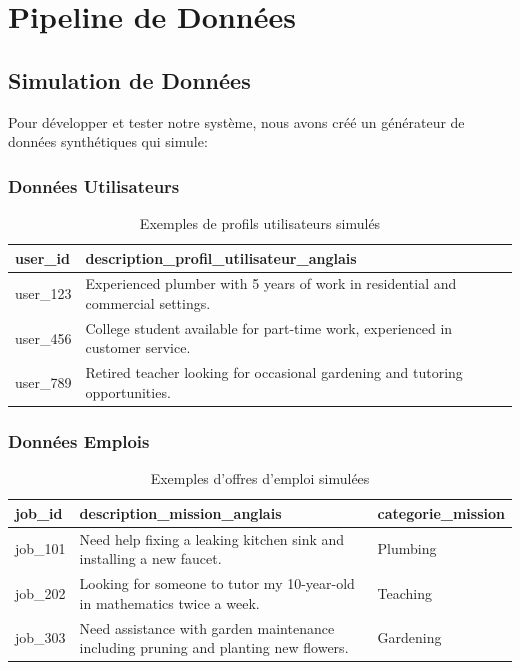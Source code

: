 \documentclass[12pt,a4paper]{article}
\begin{document}
\section{Pipeline de Données}
\subsection{Simulation de Données}

Pour développer et tester notre système, nous avons créé un générateur de données synthétiques qui simule:

\subsubsection{Données Utilisateurs}
\begin{table}[H]
\centering
\begin{tabular}{|l|p{9cm}|}
\hline
\textbf{user\_id} & \textbf{description\_profil\_utilisateur\_anglais} \\
\hline
user\_123 & Experienced plumber with 5 years of work in residential and commercial settings. \\
\hline
user\_456 & College student available for part-time work, experienced in customer service. \\
\hline
user\_789 & Retired teacher looking for occasional gardening and tutoring opportunities. \\
\hline
\end{tabular}
\caption{Exemples de profils utilisateurs simulés}
\label{tab:users}
\end{table}

\subsubsection{Données Emplois}
\begin{table}[H]
\centering
\begin{tabular}{|l|p{6cm}|l|}
\hline
\textbf{job\_id} & \textbf{description\_mission\_anglais} & \textbf{categorie\_mission} \\
\hline
job\_101 & Need help fixing a leaking kitchen sink and installing a new faucet. & Plumbing \\
\hline
job\_202 & Looking for someone to tutor my 10-year-old in mathematics twice a week. & Teaching \\
\hline
job\_303 & Need assistance with garden maintenance including pruning and planting new flowers. & Gardening \\
\hline
\end{tabular}
\caption{Exemples d'offres d'emploi simulées}
\label{tab:jobs}
\end{table}
\end{document}
